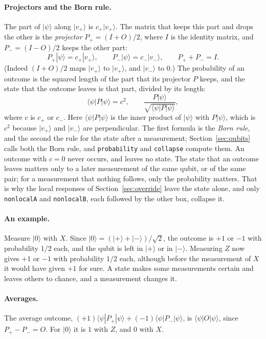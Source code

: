\documentclass[11pt]{article}
\newcommand{\hs}{\lstinline[style=hask,basicstyle=\ttfamily,frame=none]}
\begin{document}
\paragraph{Projectors and the Born rule.} The part of $|\psi\rangle$ along $|v_+\rangle$ is $c_+|v_+\rangle$. The matrix that keeps this part and drops the other is the \emph{projector} $P_+ = (I + O)/2$, where $I$ is the identity matrix, and $P_- = (I - O)/2$ keeps the other part:
\[
  P_+|\psi\rangle = c_+|v_+\rangle, \qquad P_-|\psi\rangle = c_-|v_-\rangle, \qquad P_+ + P_- = I.
\]
(Indeed $(I + O)/2$ maps $|v_+\rangle$ to $|v_+\rangle$, and $|v_-\rangle$ to $0$.) The probability of an outcome is the squared length of the part that its projector $P$ keeps, and the state that the outcome leaves is that part, divided by its length:
\[
  \langle\psi|P|\psi\rangle = c^2, \qquad \frac{P|\psi\rangle}{\sqrt{\langle\psi|P|\psi\rangle}},
\]
where $c$ is $c_+$ or $c_-$. Here $\langle\psi|P|\psi\rangle$ is the inner product of $|\psi\rangle$ with $P|\psi\rangle$, which is $c^2$ because $|v_+\rangle$ and $|v_-\rangle$ are perpendicular. The first formula is the \emph{Born rule}, and the second the rule for the state after a measurement; Section~\ref{sec:qubits} calls both the Born rule, and \hs|probability| and \hs|collapse| compute them. An outcome with $c = 0$ never occurs, and leaves no state. The state that an outcome leaves matters only to a later measurement of the same qubit, or of the same pair; for a measurement that nothing follows, only the probability matters. That is why the local responses of Section~\ref{sec:override} leave the state alone, and only \hs|nonlocalA| and \hs|nonlocalB|, each followed by the other box, collapse it.

\paragraph{An example.} Measure $|0\rangle$ with $X$. Since $|0\rangle = (|{+}\rangle + |{-}\rangle)/\sqrt2$, the outcome is $+1$ or $-1$ with probability $1/2$ each, and the qubit is left in $|{+}\rangle$ or in $|{-}\rangle$. Measuring $Z$ now gives $+1$ or $-1$ with probability $1/2$ each, although before the measurement of $X$ it would have given $+1$ for sure. A state makes some measurements certain and leaves others to chance, and a measurement changes it.

\paragraph{Averages.} The average outcome, $(+1)\langle\psi|P_+|\psi\rangle + (-1)\langle\psi|P_-|\psi\rangle$, is $\langle\psi|O|\psi\rangle$, since $P_+ - P_- = O$. For $|0\rangle$ it is $1$ with $Z$, and $0$ with $X$.
\end{document}
